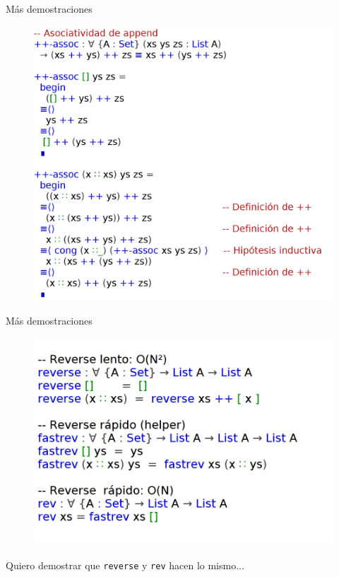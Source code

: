 \documentclass[11pt]{beamer}
\begin{document}
\begin{frame}{Más demostraciones}
\begin{figure}
\includegraphics[scale=0.5]{img/assoc}
\end{figure}
\end{frame}

\begin{frame}{Más demostraciones}
\begin{figure}
\includegraphics[scale=0.65]{img/rev-def}
\end{figure}

Quiero demostrar que \texttt{reverse} y \texttt{rev} hacen lo mismo...
\end{frame}
\end{document}
